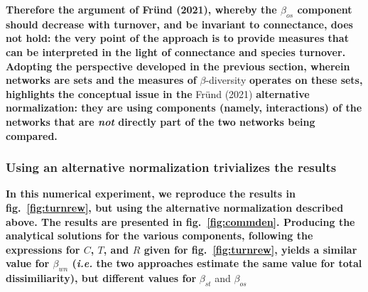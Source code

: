 \documentclass[11pt]{article}
\makeatletter
\def\maxwidth{\ifdim\Gin@nat@width>\linewidth\linewidth
\else\Gin@nat@width\fi}
\let\Oldincludegraphics\includegraphics
\renewcommand{\includegraphics}[1]{\Oldincludegraphics[width=\maxwidth]{#1}}
\providecommand{\DIFaddtex}[1]{{\bf #1}} %
\providecommand{\DIFdeltex}[1]{} %
\providecommand{\DIFaddbegin}{\protect\color{blue}} %
\providecommand{\DIFaddend}{\protect\color{black}} %
\providecommand{\DIFdelbegin}{\protect\color{red}} %
\providecommand{\DIFdelend}{\protect\color{black}} %
\providecommand{\DIFadd}[1]{\texorpdfstring{\DIFaddtex{#1}}{#1}} %
\providecommand{\DIFdel}[1]{\texorpdfstring{\DIFdeltex{#1}}{}} %
\newcommand{\DIFscaledelfig}{0.5}
\newlength{\DIFdelgraphicswidth} %
\newlength{\DIFdelgraphicsheight} %
\newcommand{\DIFaddincludegraphics}[2][]{{\color{blue}\fbox{\DIFOincludegraphics[#1]{#2}}}} %
\newcommand{\DIFdelincludegraphics}[2][]{%
\sbox{\DIFdelgraphicsbox}{\DIFOincludegraphics[#1]{#2}}%
\settoboxwidth{\DIFdelgraphicswidth}{\DIFdelgraphicsbox} %
\settoboxtotalheight{\DIFdelgraphicsheight}{\DIFdelgraphicsbox} %
\scalebox{\DIFscaledelfig}{%
\parbox[b]{\DIFdelgraphicswidth}{\usebox{\DIFdelgraphicsbox}\\[-\baselineskip] \rule{\DIFdelgraphicswidth}{0em}}\llap{\resizebox{\DIFdelgraphicswidth}{\DIFdelgraphicsheight}{%
\setlength{\unitlength}{\DIFdelgraphicswidth}%
\begin{picture}(1,1)%
\thicklines\linethickness{2pt} %
{\color[rgb]{1,0,0}\put(0,0){\framebox(1,1){}}}%
{\color[rgb]{1,0,0}\put(0,0){\line( 1,1){1}}}%
{\color[rgb]{1,0,0}\put(0,1){\line(1,-1){1}}}%
\end{picture}%
}\hspace*{3pt}}} %
} %
\DeclareRobustCommand{\DIFaddbegin}{\DIFOaddbegin \let\includegraphics\DIFaddincludegraphics} %
\DeclareRobustCommand{\DIFaddend}{\DIFOaddend \let\includegraphics\DIFOincludegraphics} %
\DeclareRobustCommand{\DIFdelbegin}{\DIFOdelbegin \let\includegraphics\DIFdelincludegraphics} %
\DeclareRobustCommand{\DIFdelend}{\DIFOaddend \let\includegraphics\DIFOincludegraphics} %
\makeatother
\begin{document}
\DIFdelbegin \DIFdel{The choice of changing the denominator hinges on what one admits as a
definition for \(\beta_{st}\). If the point of \(\beta_{st}\) is to be a
component of overall }\DIFdelend \DIFaddbegin \DIFadd{Therefore the argument of Fründ (2021), whereby the \(\beta_{os}\)
component should decrease with turnover, and be invariant to
connectance, does not hold: the very point of the approach is to provide
measures that can be interpreted in the light of connectance and species
turnover. Adopting the perspective developed in the previous section,
wherein networks are sets and the measures of }\DIFaddend \(\beta\)-diversity
\DIFdelbegin \DIFdel{as advocated by }\DIFdelend \DIFaddbegin \DIFadd{operates on these sets, highlights the conceptual issue in the }\DIFaddend Fründ
(2021) \DIFdelbegin \DIFdel{and Novotny (2009), a change of numerator \emph{might} be acceptable.
Nevertheless,
this change of numerator contributes to blurring the frontier between a measure of interaction dissimilarity and a measure of community dissimilarity which starts to add the
effect of relative
richness; this later case warrants a thorough methodological assessment.
Conversely, if as we argue in
Poisot \emph{et al.} (2012), }\DIFdelend \DIFaddbegin \DIFadd{alternative normalization: they are using components (namely,
interactions) of the networks that are \emph{not} directly part of the
two networks being compared.
}

\hypertarget{using-an-alternative-normalization-trivializes-the-results}{%
\subsubsection{Using an alternative normalization trivializes the
results}\label{using-an-alternative-normalization-trivializes-the-results}}

\DIFadd{In this numerical experiment, we reproduce the results in
fig.~\ref{fig:turnrew}, but using the alternative normalization
described above. The results are presented in fig.~\ref{fig:commden}.
Producing the analytical solutions for the various components, following
the expressions for \(C\), \(T\), and \(R\) given for
fig.~\ref{fig:turnrew}, yields a similar value for \(\beta_{wn}\)
(\emph{i.e.} the two approaches estimate the same value for total
dissimiliarity), but different values for }\DIFaddend \(\beta_{st}\) \DIFdelbegin \DIFdel{is to be meant as a \emph{guide} to the interpretation of
\(\beta_{wn}\) }\DIFdelend and
\(\beta_{os}\)\DIFdelbegin \DIFdel{, and related to actual measures of
species turnoverand network connectance, one must not change the denominator. }%
\end{document}
